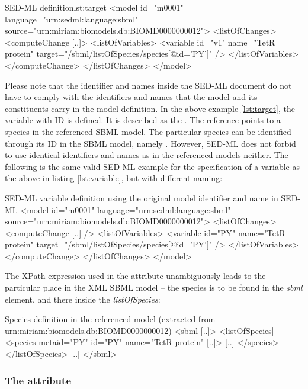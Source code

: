 %
\begin{myXmlLst}{SED-ML  definition}{lst:target}
<model id="m0001" language="urn:sedml:language:sbml" 
 source="urn:miriam:biomodels.db:BIOMD0000000012">
 <listOfChanges>
  <computeChange [..]>
   <listOfVariables>
    <variable id="v1" name="TetR protein" target="/sbml/listOfSpecies/species[@id='PY']" />
   </listOfVariables>
  </computeChange>
 </listOfChanges>
</model>
\end{myXmlLst}
%
Please note that the identifier and names inside the SED-ML document do not have to comply with the identifiers and names that the model and its constituents carry in the model definition. In the above example \ref{lst:target}, the variable with ID  is defined. It is described as the . The reference points to a species in the referenced SBML model. The particular species can be identified through its ID in the SBML model, namely . However, SED-ML does not forbid to use identical identifiers and names as in the referenced models neither. The following is the same valid SED-ML example for the specification of a variable as the above in listing \ref{lst:variable}, but with different naming:
%
\begin{myXmlLst}{SED-ML variable definition using the original model identifier and name in SED-ML}{}
<model id="m0001" language="urn:sedml:language:sbml" 
 source="urn:miriam:biomodels.db:BIOMD0000000012">
 <listOfChanges>
  <computeChange [..] />
   <listOfVariables>
    <variable id="PY" name="TetR protein" target="/sbml/listOfSpecies/species[@id='PY']" />
   </listOfVariables>
  </computeChange>
 </listOfChanges>
</model>
\end{myXmlLst}
%

The XPath expression used in the  attribute unambiguously leads to the particular place in the XML SBML model -- the species is to be found in the \emph{sbml} element, and there inside the \emph{listOfSpecies}:
%
\begin{myXmlLst}{Species definition in the referenced model (extracted from \url{urn:miriam:biomodels.db:BIOMD0000000012})}{}
<sbml [..]>
 <listOfSpecies]
  <species metaid="PY" id="PY" name="TetR protein" [..]>
   [..]
  </species>
 </listOfSpecies>
 [..]
</sbml>
\end{myXmlLst}
%

\subsubsection{The  attribute}
\label{sec:symbol}

